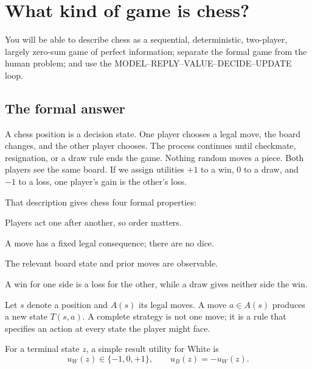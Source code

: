 \chapter{What kind of game is chess?}
\begin{learningbox}
You will be able to describe chess as a sequential, deterministic, two-player, largely zero-sum game of perfect information; separate the formal game from the human problem; and use the MODEL--REPLY--VALUE--DECIDE--UPDATE loop.
\end{learningbox}

\section{The formal answer}
A chess position is a decision state. One player chooses a legal move, the board changes, and the other player chooses. The process continues until checkmate, resignation, or a draw rule ends the game. Nothing random moves a piece. Both players see the same board. If we assign utilities $+1$ to a win, $0$ to a draw, and $-1$ to a loss, one player's gain is the other's loss.

That description gives chess four formal properties:

\begin{description}[style=nextline,leftmargin=2.4em,labelsep=.5em]
\item[Sequential.] Players act one after another, so order matters.
\item[Deterministic.] A move has a fixed legal consequence; there are no dice.
\item[Perfect information.] The relevant board state and prior moves are observable.
\item[Constant-sum at the result level.] A win for one side is a loss for the other, while a draw gives neither side the win.
\end{description}

\begin{formalbox}
Let $s$ denote a position and $A(s)$ its legal moves. A move $a\in A(s)$ produces a new state $T(s,a)$. A complete strategy is not one move; it is a rule that specifies an action at every state the player might face.

For a terminal state $z$, a simple result utility for White is
\[
u_W(z)\in\{-1,0,+1\}, \qquad u_B(z)=-u_W(z).
\]
\end{formalbox}


